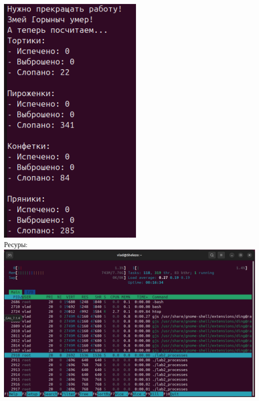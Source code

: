 \documentclass[a4paper,14pt]{extarticle}
\begin{document}
\includegraphics[width=70mm]{processes_output_2_7}\\
Ресуры:\\
\includegraphics[width=140mm]{processes_resources_2}
\end{document}
